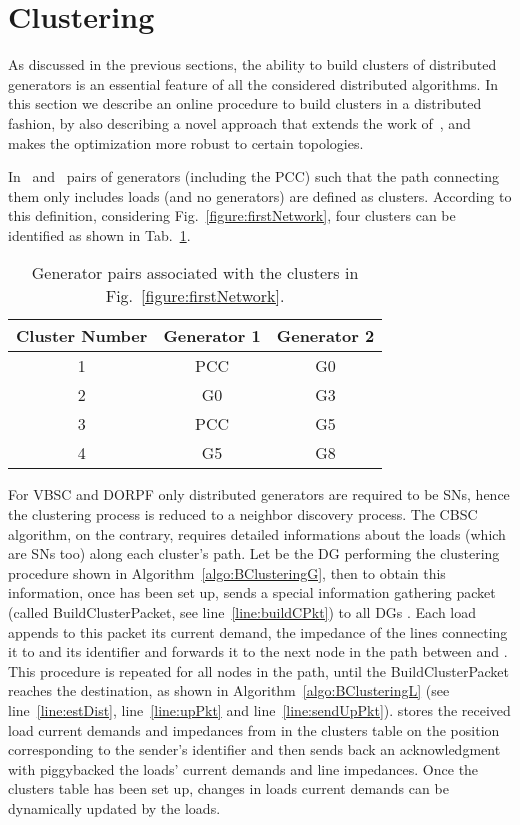 \documentclass[journal]{IEEEtran}
\newcommand{\fig}[1]{Fig.~\ref{#1}}
\newcommand{\tab}[1]{Tab.~\ref{#1}}
\begin{document}
\section{Clustering}
\label{sec:clustering}

As discussed in the previous sections, the ability to build clusters of distributed generators is an essential feature of all the considered distributed algorithms. In this section we describe an online procedure to build clusters in a distributed fashion, by also describing a novel approach that extends the work of~\cite{SurroundControl}, and makes the optimization more robust to certain topologies. 

In~\cite{SurroundControl} and~\cite{DORPF} pairs of generators (including the PCC) such that the path connecting them only includes loads (and no generators) are defined as clusters. According to this definition, considering \fig{figure:firstNetwork}, four clusters can be identified as shown in \tab{table:GenClusters}.

\begin{table}[ht]
\caption{Generator pairs associated with the clusters in \fig{figure:firstNetwork}.}
\centering
\begin{tabular}{| c | c c |}
\hline
Cluster Number & Generator 1 & Generator 2 \\
\hline\hline
1 & PCC & G0 \\
\hline
2 & G0 & G3 \\
\hline
3 & PCC & G5 \\
\hline
4 & G5 & G8 \\
\hline
\end{tabular}
\label{table:GenClusters}
\end{table}

For VBSC and DORPF only distributed generators are required to be SNs, hence the clustering process is reduced to a neighbor discovery process. 
The CBSC algorithm, on the contrary, requires detailed informations about the loads (which are SNs too) along each cluster's path. Let  be the DG performing the clustering procedure shown in Algorithm~\ref{algo:BClusteringG}, then to obtain this information, once  has been set up,  sends a special information gathering packet (called BuildClusterPacket, see line~\ref{line:buildCPkt}) to all DGs . Each load  appends to this packet its current demand, the impedance of the lines connecting it to  and its identifier  and forwards it to the next node in the path between  and . This procedure is repeated for all nodes  in the path, until the BuildClusterPacket reaches the destination, as shown in Algorithm~\ref{algo:BClusteringL} (see line~\ref{line:estDist}, line~\ref{line:upPkt} and line~\ref{line:sendUpPkt}).  stores the received load current demands and impedances from  in the clusters table on the position corresponding to the sender's identifier and then sends back an acknowledgment with piggybacked the loads' current demands and line impedances. Once the clusters table has been set up, changes in loads current demands can be dynamically updated by the loads. 
\end{document}
